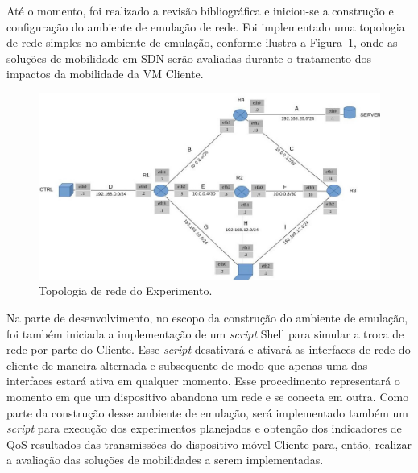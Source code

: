 \documentclass[	12pt, Times, openright, twoside, a4paper, english, brazil]{abntex2}
\begin{document}
Até o momento, foi realizado a revisão bibliográfica e iniciou-se a construção e configuração do ambiente de emulação de rede. Foi implementado uma topologia de rede simples no ambiente de emulação, conforme ilustra a Figura~\ref{fig:Topologia_Experimento}, onde as soluções de mobilidade em SDN serão avaliadas durante o tratamento dos impactos da mobilidade da VM Cliente.

\begin{figure}[h]
    \begin{center}  
    \includegraphics[width=450pt]{TOPOLOGIA-REDE-EXP1.jpg}
    \caption{Topologia de rede do Experimento.}
    \label{fig:Topologia_Experimento}
    \end{center}
\end{figure}


Na parte de desenvolvimento, no escopo da construção do ambiente de emulação, foi também iniciada a implementação de um \textit{script} Shell para simular a troca de rede por parte do Cliente. Esse \textit{script} desativará e ativará as interfaces de rede do cliente de maneira alternada e subsequente de modo que apenas uma das interfaces estará ativa em qualquer momento. Esse procedimento representará o momento em que um dispositivo abandona um rede e se conecta em outra. Como parte da construção desse ambiente de emulação, será implementado também um \textit{script} para execução dos experimentos planejados e obtenção dos indicadores de QoS resultados das transmissões do dispositivo móvel Cliente para, então, realizar a avaliação das soluções de mobilidades a serem implementadas. 
\end{document}

